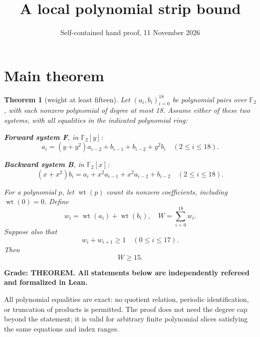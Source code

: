 \documentclass{article}
\title{A local polynomial strip bound}
\author{}
\date{Self-contained hand proof, 11 November 2026}
\newtheorem*{maintheorem}{Theorem}
\DeclareMathOperator{\wt}{wt}
\begin{document}
\maketitle

\section{Main theorem}\label{sec:main}

\begin{maintheorem}[weight at least fifteen]
  Let \((a_i,b_i)_{i=0}^{18}\) be polynomial pairs over \(\mathbb{F}_2\), with each nonzero
  polynomial of degree at most 18. Assume either of these two systems, with all equalities in the
  indicated polynomial ring:

  \textbf{Forward system F}, in \(\mathbb{F}_2[y]\):
  \begin{equation}\label{eq:forward}
    a_i = (y + y^2) a_{i-2} + b_{i-1} + b_{i-2} + y^2 b_i \quad (2 \le i \le 18).
  \end{equation}

  \textbf{Backward system B}, in \(\mathbb{F}_2[x]\):
  \begin{equation}\label{eq:backward}
    (x + x^2) b_i = a_i + x^2 a_{i-1} + x^2 a_{i-2} + b_{i-2} \quad (2 \le i \le 18).
  \end{equation}

  For a polynomial \(p\), let \(\wt(p)\) count its nonzero coefficients, including
  \(\wt(0) = 0\). Define
  \begin{equation}
    w_i = \wt(a_i) + \wt(b_i), \quad W = \sum_{i=0}^{18} w_i.
  \end{equation}
  Suppose also that
  \begin{equation}\label{eq:adjacent}
    w_i + w_{i+1} \ge 1 \quad (0 \le i \le 17).
  \end{equation}
  Then
  \begin{equation}\label{eq:main-bound}
    W \ge 15.
  \end{equation}
\end{maintheorem}

\textbf{Grade: THEOREM. All statements below are independently refereed and formalized in Lean.}

All polynomial equalities are exact: no quotient relation, periodic identification, or truncation
of products is permitted. The proof does not need the degree cap beyond the statement; it is valid
for arbitrary finite polynomial slices satisfying the same equations and index ranges.
\end{document}
